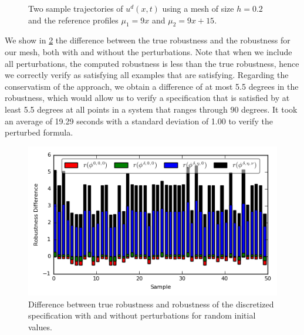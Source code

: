 \documentclass[letterpaper, 10 pt, conference]{ieeeconf/ieeeconf}
\begin{document}
\begin{figure}[!t]
    \centering 
        \hfill
        \hfill
        \caption{Two sample trajectories of $u^d(x, t)$ using a mesh of size
        $h=0.2$ and the reference profiles $\mu_1 = 9x$ and $\mu_2 = 9x + 15$.}
    \label{fig:ex2_evolution}
\end{figure}


We show in \cref{fig:res_diffs} the difference between the true robustness and
the robustness for our mesh, both with and without the perturbations. Note that
when we include all perturbations, the computed robustness is less than the true
robustness, hence we correctly verify as satisfying all examples
that are satisfying. Regarding the conservatism of the approach, we obtain a
difference of at most 5.5 degrees in the robustness, which would allow us to verify a
specification that is satisfied by at least 5.5 degrees at all points in a system
that ranges through 90 degrees. It took an average of 19.29 seconds with a
standard deviation of 1.00 to verify the perturbed formula.

\begin{figure}
    \centering
    \includegraphics[width=0.8\linewidth]{figures/cs_ran_init_results.png}
    \caption{Difference between true robustness and robustness of the
        discretized specification with and without perturbations for
        random initial values.}
    \label{fig:res_diffs}
\end{figure}
\end{document}
